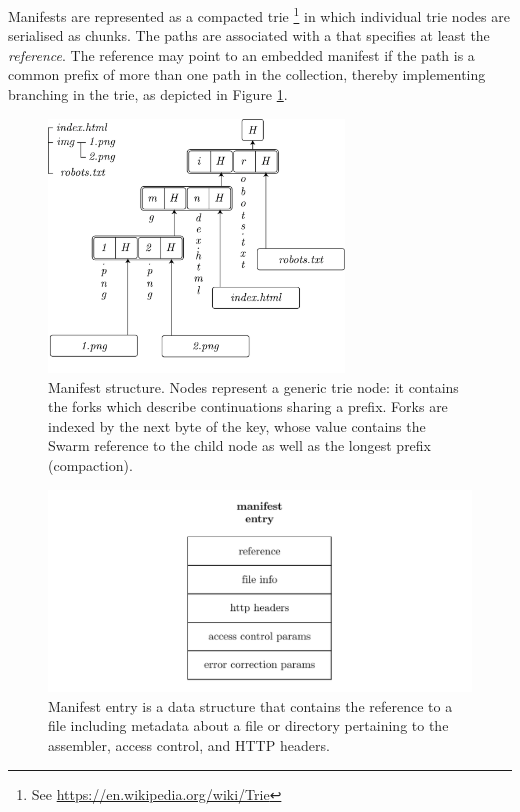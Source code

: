 Manifests are represented as a compacted trie%
%
\footnote{See \url{https://en.wikipedia.org/wiki/Trie}}
%
in which individual trie nodes are serialised as chunks. The paths are associated with a  that specifies at least the \emph{reference}. The reference may point to an embedded manifest if the path is a common prefix of more than one path in the collection, thereby implementing branching in the trie, as depicted in Figure \ref{fig:manifest-structure}. 


\begin{figure}[htbp]
\centering
\includegraphics[width=0.7\textwidth]{fig/manifest-structure.pdf}
\caption[Manifest structure \statusgreen]{Manifest structure. Nodes represent a generic trie node: it contains the forks which describe continuations sharing a prefix. Forks are indexed by the next byte of the key, whose value contains the Swarm reference to the child node as well as the longest prefix (compaction).}
\label{fig:manifest-structure}
\end{figure}

\begin{figure}[htbp]
\centering
\includegraphics[width=\textwidth]{fig/manifest-entry.pdf}
\caption[Manifest entry \statusgreen]{Manifest entry is a data  structure that contains the reference to a file including metadata about a file or directory  pertaining to the assembler, access control, and HTTP headers.}
\label{fig:manifest-entry}
\end{figure}

